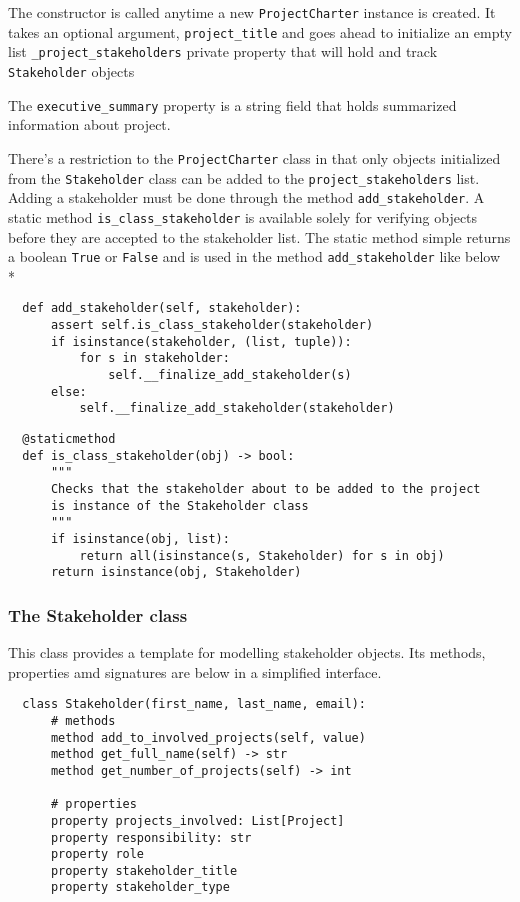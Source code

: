 The constructor is called anytime a new \verb+ProjectCharter+ instance is created. It takes an optional argument, \verb+project_title+ and goes ahead to initialize an empty list \verb+_project_stakeholders+ private property that will hold and track \verb+Stakeholder+ objects

The \verb+executive_summary+ property is a string field that holds summarized information about project.

There's a restriction to the \verb+ProjectCharter+ class in that only objects initialized from the \verb+Stakeholder+ class can be added to the \verb+project_stakeholders+ list. \linebreak Adding a stakeholder must be done through the method \verb+add_stakeholder+. A static method \verb+is_class_stakeholder+ is available solely for verifying objects before they are accepted to the stakeholder list. The static method simple returns a boolean \verb+True+ or \verb+False+ and is used in the method \verb+add_stakeholder+ like below\\*

\begin{lstlisting}
  def add_stakeholder(self, stakeholder):
      assert self.is_class_stakeholder(stakeholder)
      if isinstance(stakeholder, (list, tuple)):
          for s in stakeholder:
              self.__finalize_add_stakeholder(s)
      else:
          self.__finalize_add_stakeholder(stakeholder)
\end{lstlisting}

\vfill

\begin{lstlisting}
  @staticmethod
  def is_class_stakeholder(obj) -> bool:
      """
      Checks that the stakeholder about to be added to the project
      is instance of the Stakeholder class
      """
      if isinstance(obj, list):
          return all(isinstance(s, Stakeholder) for s in obj)
      return isinstance(obj, Stakeholder)
\end{lstlisting}


\subsubsection{The Stakeholder class}
This class provides a template for modelling stakeholder objects. Its methods, properties amd signatures are below in a simplified interface.

\begin{lstlisting}
  class Stakeholder(first_name, last_name, email):
      # methods
      method add_to_involved_projects(self, value)
      method get_full_name(self) -> str
      method get_number_of_projects(self) -> int

      # properties
      property projects_involved: List[Project]
      property responsibility: str
      property role
      property stakeholder_title
      property stakeholder_type
\end{lstlisting}

